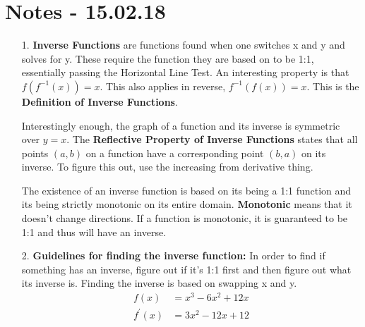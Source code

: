 \documentclass[11pt]{article}
\begin{document}
\section{Notes - 15.02.18}
\begin{itemize}
	\item[1. ] {\bf Inverse Functions} are functions found when one switches x and y and solves for y.  These require the function they are based on to be 1:1, essentially passing the Horizontal Line Test.  An interesting property is that $f(f^{-1}(x)) = x$.  This also applies in reverse, $f^{-1}(f(x)) = x$.  This is the {\bf Definition of Inverse Functions}.
	
	Interestingly enough, the graph of a function and its inverse is symmetric over $y=x$.  The {\bf Reflective Property of Inverse Functions} states that all points $(a, b)$ on a function have a corresponding point $(b, a)$ on its inverse.  To figure this out, use the increasing from derivative thing.
	

	The existence of an inverse function is based on its being a 1:1 function and its being strictly monotonic on its entire domain.  {\bf Monotonic} means that it doesn't change directions.  If a function is monotonic, it is guaranteed to be 1:1 and thus will have an inverse.
		
		\item[2. ] {\bf Guidelines for finding the inverse function:  }In order to find if something has an inverse, figure out if it's 1:1 first and then figure out what its inverse is.  Finding the inverse is based on swapping x and y.
		\begin{align*}
			f(x) &= x^3-6x^2+12x\\
			f^\prime (x) &= 3x^2-12x+12\\
		\end{align*}
\end{itemize}
\end{document}
